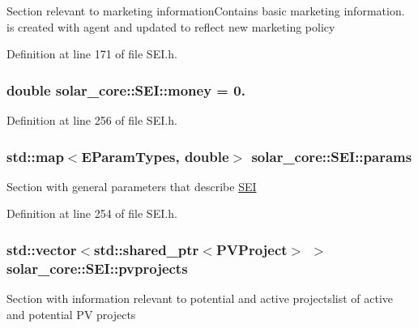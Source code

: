 Section relevant to marketing information\+Contains basic marketing information. is created with agent and updated to reflect new marketing policy 

Definition at line 171 of file S\+E\+I.\+h.

\hypertarget{classsolar__core_1_1_s_e_i_a8ab5ab03ef726a3354b7c0e0d18da82a}{}
\subsubsection[{money}]{\setlength{\rightskip}{0pt plus 5cm}double solar\+\_\+core\+::\+S\+E\+I\+::money = 0.\hspace{0.3cm}{\ttfamily [protected]}}\label{classsolar__core_1_1_s_e_i_a8ab5ab03ef726a3354b7c0e0d18da82a}


Definition at line 256 of file S\+E\+I.\+h.

\hypertarget{classsolar__core_1_1_s_e_i_a811b998092171224983f9aefaa974707}{}
\subsubsection[{params}]{\setlength{\rightskip}{0pt plus 5cm}std\+::map$<${\bf E\+Param\+Types}, double$>$ solar\+\_\+core\+::\+S\+E\+I\+::params\hspace{0.3cm}{\ttfamily [protected]}}\label{classsolar__core_1_1_s_e_i_a811b998092171224983f9aefaa974707}
Section with general parameters that describe \hyperlink{classsolar__core_1_1_s_e_i}{S\+E\+I} 

Definition at line 254 of file S\+E\+I.\+h.

\hypertarget{classsolar__core_1_1_s_e_i_a76d9d151e51465d534ff0fd3d64f98bc}{}
\subsubsection[{pvprojects}]{\setlength{\rightskip}{0pt plus 5cm}std\+::vector$<$std\+::shared\+\_\+ptr$<${\bf P\+V\+Project}$>$ $>$ solar\+\_\+core\+::\+S\+E\+I\+::pvprojects\hspace{0.3cm}{\ttfamily [protected]}}\label{classsolar__core_1_1_s_e_i_a76d9d151e51465d534ff0fd3d64f98bc}
Section with information relevant to potential and active projectslist of active and potential P\+V projects 

